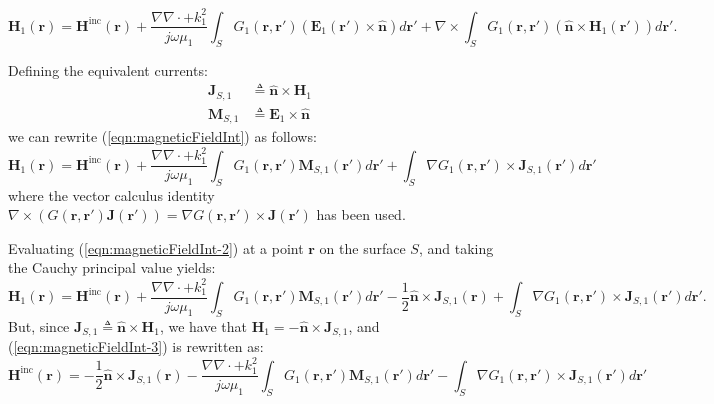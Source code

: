 \documentclass[a4paper,10pt]{book}
\newcommand{\field}[1]{\mathbf{#1}}
\newcommand{\current}[1]{\mathbf{#1}}
\newcommand{\vect}[1]{\mathbf{#1}}
\begin{document}
\begin{equation}\label{eqn:magneticFieldInt}
\field{H}_1\left(\vect{r}\right) = \field{H}^\text{inc}\left(\vect{r}\right) + \frac{\nabla \nabla \cdot + k_1^2}{j \omega \mu_1} \int_S G_1(\vect{r}, \vect{r}') \left(\field{E}_1\left(\vect{r}'\right) \times \vect{\hat{n}}\right) d\vect{r}' + \nabla \times \int_S G_1(\vect{r}, \vect{r}') \left(  \vect{\hat{n}} \times \field{H}_1\left(\vect{r}'\right) \right) d\vect{r}'.
\end{equation}
%
\par
Defining the equivalent currents:
\begin{align}
\current{J}_{S,1} &\triangleq \vect{\hat{n}} \times \field{H}_1 \\
\current{M}_{S,1} &\triangleq \field{E}_1 \times \vect{\hat{n}} 
\end{align}
we can rewrite (\ref{eqn:magneticFieldInt}) as follows:
\begin{equation}\label{eqn:magneticFieldInt-2}
\field{H}_1\left(\vect{r}\right) = \field{H}^\text{inc}\left(\vect{r}\right) + \frac{\nabla \nabla \cdot + k_1^2}{j \omega \mu_1} \int_S G_1(\vect{r}, \vect{r}') \current{M}_{S,1}\left(\vect{r}'\right) d\vect{r}' + \int_S \nabla G_1(\vect{r}, \vect{r}') \times \current{J}_{S,1}\left(\vect{r}'\right) d\vect{r}' 
\end{equation}
where the vector calculus identity $\nabla \times \left( G(\vect{r}, \vect{r}') \current{J}\left(\vect{r}'\right)\right) = \nabla G(\vect{r}, \vect{r}') \times \current{J}\left(\vect{r}'\right)$ has been used.
%
\par
Evaluating (\ref{eqn:magneticFieldInt-2}) at a point $\vect{r}$ on the surface $S$, and taking the Cauchy principal value \cite{Arnoldus2011} yields:
\begin{equation}\label{eqn:magneticFieldInt-3}
\field{H}_1\left(\vect{r}\right) = \field{H}^\text{inc}\left(\vect{r}\right) + \frac{\nabla \nabla \cdot + k_1^2}{j \omega \mu_1} \int_S G_1(\vect{r}, \vect{r}') \current{M}_{S,1}\left(\vect{r}'\right) d\vect{r}' -\frac{1}{2} \vect{\hat{n}} \times \current{J}_{S,1}\left(\vect{r}\right) + \int_S \nabla G_1(\vect{r}, \vect{r}') \times \current{J}_{S,1}\left(\vect{r}'\right) d\vect{r}'.
\end{equation}
But, since $\current{J}_{S,1} \triangleq \vect{\hat{n}} \times \field{H}_1$, we have that $\field{H}_1 = -\vect{\hat{n}} \times \current{J}_{S,1}$, and (\ref{eqn:magneticFieldInt-3}) is rewritten as:
\begin{equation}\label{eqn:magneticFieldInt-4}
\boxed{
\field{H}^\text{inc}\left(\vect{r}\right) = - \frac{1}{2} \vect{\hat{n}} \times \current{J}_{S,1}\left(\vect{r}\right) - \frac{\nabla \nabla \cdot + k_1^2}{j \omega \mu_1} \int_S G_1(\vect{r}, \vect{r}') \current{M}_{S,1}\left(\vect{r}'\right) d\vect{r}'  - \int_S \nabla G_1(\vect{r}, \vect{r}') \times \current{J}_{S,1}\left(\vect{r}'\right) d\vect{r}'}
\end{equation}
\end{document}
